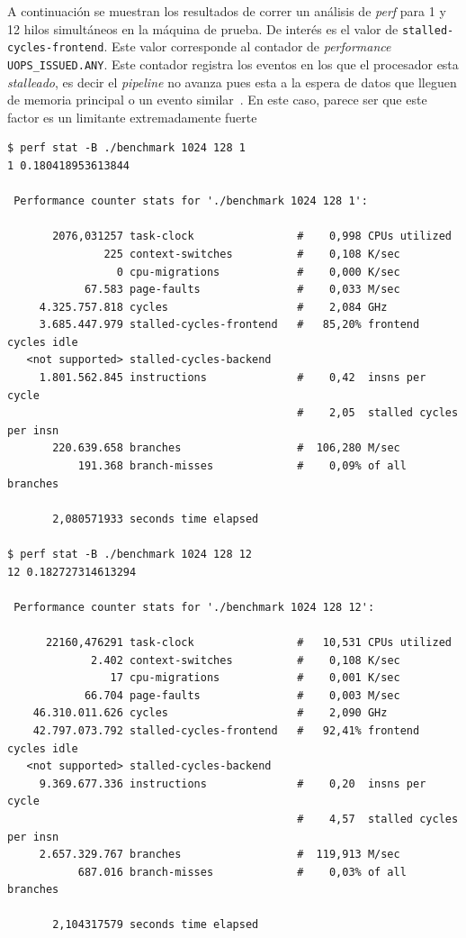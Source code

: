 A continuaci\'on se muestran los resultados de correr
un an\'alisis de \textit{perf} para 1 y 12 hilos simult\'aneos en la m\'aquina de
prueba. De inter\'es es el valor de \texttt{stalled-cycles-frontend}. Este valor
corresponde al contador de \textit{performance} \texttt{UOPS\_ISSUED.ANY}. Este
contador registra los eventos en los que el procesador esta \textit{stalleado},
es decir el \textit{pipeline } no avanza pues esta a la espera de datos que
lleguen de memoria principal o un evento similar~\cite{Intel3B}. En este
caso, parece ser que este factor es un limitante extremadamente fuerte

{\footnotesize
\begin{verbatim}
$ perf stat -B ./benchmark 1024 128 1
1 0.180418953613844

 Performance counter stats for './benchmark 1024 128 1':

       2076,031257 task-clock                #    0,998 CPUs utilized
               225 context-switches          #    0,108 K/sec
                 0 cpu-migrations            #    0,000 K/sec
            67.583 page-faults               #    0,033 M/sec
     4.325.757.818 cycles                    #    2,084 GHz
     3.685.447.979 stalled-cycles-frontend   #   85,20% frontend cycles idle
   <not supported> stalled-cycles-backend
     1.801.562.845 instructions              #    0,42  insns per cycle
                                             #    2,05  stalled cycles per insn
       220.639.658 branches                  #  106,280 M/sec
           191.368 branch-misses             #    0,09% of all branches

       2,080571933 seconds time elapsed

$ perf stat -B ./benchmark 1024 128 12
12 0.182727314613294

 Performance counter stats for './benchmark 1024 128 12':

      22160,476291 task-clock                #   10,531 CPUs utilized
             2.402 context-switches          #    0,108 K/sec
                17 cpu-migrations            #    0,001 K/sec
            66.704 page-faults               #    0,003 M/sec
    46.310.011.626 cycles                    #    2,090 GHz
    42.797.073.792 stalled-cycles-frontend   #   92,41% frontend cycles idle
   <not supported> stalled-cycles-backend
     9.369.677.336 instructions              #    0,20  insns per cycle
                                             #    4,57  stalled cycles per insn
     2.657.329.767 branches                  #  119,913 M/sec
           687.016 branch-misses             #    0,03% of all branches

       2,104317579 seconds time elapsed
\end{verbatim}
}

